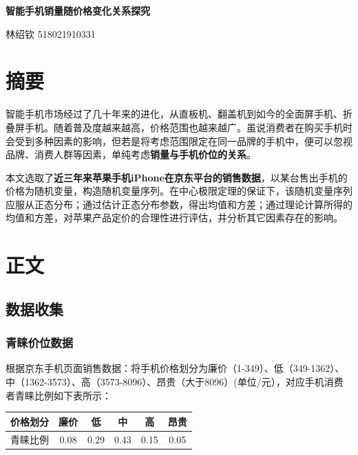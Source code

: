 \documentclass[12pt]{ctexart}
\begin{document}
\begin{center}
    \large \textbf{智能手机销量随价格变化关系探究}

    林绍钦 518021910331
\end{center}                               

\section{摘要}

    智能手机市场经过了几十年来的进化，从直板机、翻盖机到如今的全面屏手机、折叠屏手机。随着普及度越来越高，价格范围也越来越广。虽说消费者在购买手机时会受到多种因素的影响，但若是将考虑范围限定在同一品牌的手机中，便可以忽视品牌、消费人群等因素，单纯考虑\textbf{销量与手机价位的关系}。

    本文选取了\textbf{近三年来苹果手机iPhone在京东平台的销售数据}，以某台售出手机的价格为随机变量，构造随机变量序列。在中心极限定理的保证下，该随机变量序列应服从正态分布；通过估计正态分布参数，得出均值和方差；通过理论计算所得的均值和方差，对苹果产品定价的合理性进行评估，并分析其它因素存在的影响。

    \newpage
\section{正文}

    \subsection{数据收集}

        \subsubsection{青睐价位数据}   

            根据京东手机页面销售数据：将手机价格划分为廉价（1-349）、低（349-1362）、中（1362-3573）、高（3573-8096）、昂贵（大于8096）(单位/元），对应手机消费者青睐比例如下表所示：

            \begin{center}
                \begin{tabular}{|c|ccccc|}
                    \hline
                    价格划分&廉价&低&中&高&昂贵\\
                    \hline
                    青睐比例&0.08&0.29&0.43&0.15&0.05\\
                    \hline
                \end{tabular}
            \end{center}
\end{document}
